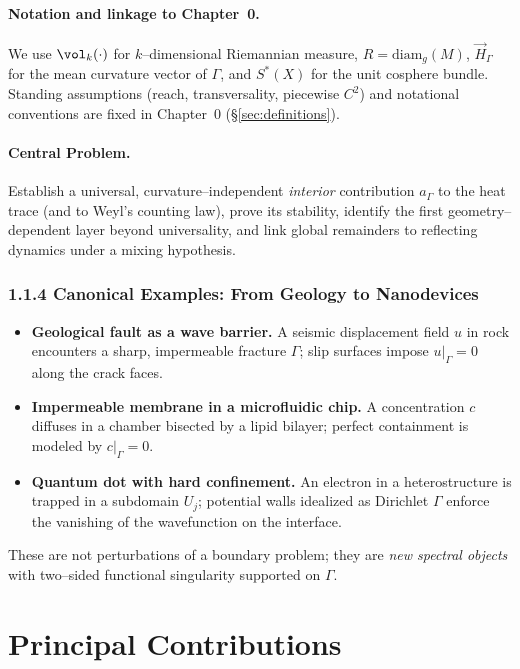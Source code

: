 \paragraph{Notation and linkage to Chapter~0.}
We use $\vol_{k}(\cdot)$ for $k$–dimensional Riemannian measure, $R=\mathrm{diam}_g(M)$, $\vec H_\Gamma$ for the mean curvature vector of $\Gamma$, and $S^*(X)$ for the unit cosphere bundle.
Standing assumptions (reach, transversality, piecewise $C^2$) and notational conventions are fixed in Chapter~0 (\S\ref{sec:definitions}).

\paragraph{Central Problem.}
Establish a universal, curvature–independent \emph{interior} contribution $a_\Gamma$ to the heat trace (and to Weyl’s counting law), prove its stability, identify the first geometry–dependent layer beyond universality, and link global remainders to reflecting dynamics under a mixing hypothesis.

\subsubsection*{1.1.4 Canonical Examples: From Geology to Nanodevices}
\begin{itemize}
  \item \textbf{Geological fault as a wave barrier.} A seismic displacement field $u$ in rock encounters a sharp, impermeable fracture $\Gamma$; slip surfaces impose $u|_\Gamma=0$ along the crack faces.
  \item \textbf{Impermeable membrane in a microfluidic chip.} A concentration $c$ diffuses in a chamber bisected by a lipid bilayer; perfect containment is modeled by $c|_\Gamma=0$.
  \item \textbf{Quantum dot with hard confinement.} An electron in a heterostructure is trapped in a subdomain $U_j$; potential walls idealized as Dirichlet $\Gamma$ enforce the vanishing of the wavefunction on the interface.
\end{itemize}
These are not perturbations of a boundary problem; they are \emph{new spectral objects} with two–sided functional singularity supported on $\Gamma$.

\medskip

\section{Principal Contributions}\label{sec:contrib}

